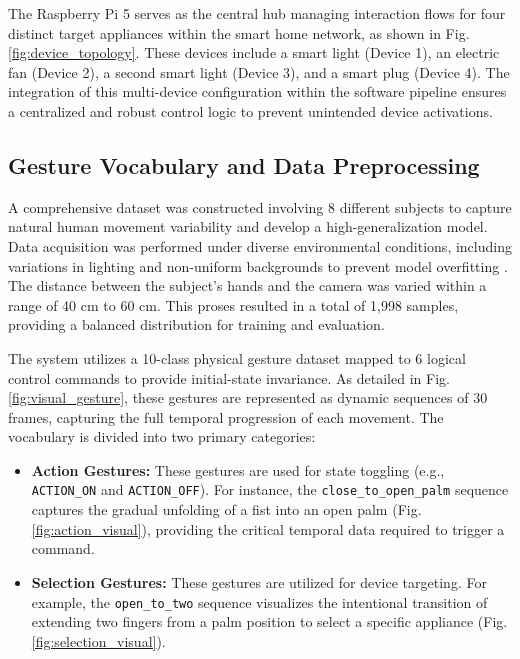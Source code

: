 The Raspberry Pi 5 serves as the central hub managing interaction flows for four distinct target appliances within the smart home network, as shown in Fig. \ref{fig:device_topology}. These devices include a smart light (Device 1), an electric fan (Device 2), a second smart light (Device 3), and a smart plug (Device 4). The integration of this multi-device configuration within the software pipeline ensures a centralized and robust control logic to prevent unintended device activations.



\subsection{Gesture Vocabulary and Data Preprocessing}

A comprehensive dataset was constructed involving 8 different subjects to capture natural human movement variability and develop a high-generalization model. Data acquisition was performed under diverse environmental conditions, including variations in lighting and non-uniform backgrounds to prevent model overfitting \cite{yu2022diversity}. The distance between the subject's hands and the camera was varied within a range of 40 cm to 60 cm. This proses resulted in a total of 1,998 samples, providing a balanced distribution for training and evaluation.

The system utilizes a 10-class physical gesture dataset mapped to 6 logical control commands to provide initial-state invariance. As detailed in Fig. \ref{fig:visual_gesture}, these gestures are represented as dynamic sequences of 30 frames, capturing the full temporal progression of each movement. The vocabulary is divided into two primary categories:

\begin{itemize}
    \item \textbf{Action Gestures:} These gestures are used for state toggling (e.g., \texttt{ACTION\_ON} and \texttt{ACTION\_OFF}). For instance, the \texttt{close\_to\_open\_palm} sequence captures the gradual unfolding of a fist into an open palm (Fig. \ref{fig:action_visual}), providing the critical temporal data required to trigger a command.
    \item \textbf{Selection Gestures:} These gestures are utilized for device targeting. For example, the \texttt{open\_to\_two} sequence visualizes the intentional transition of extending two fingers from a palm position to select a specific appliance (Fig. \ref{fig:selection_visual}). 
\end{itemize}

